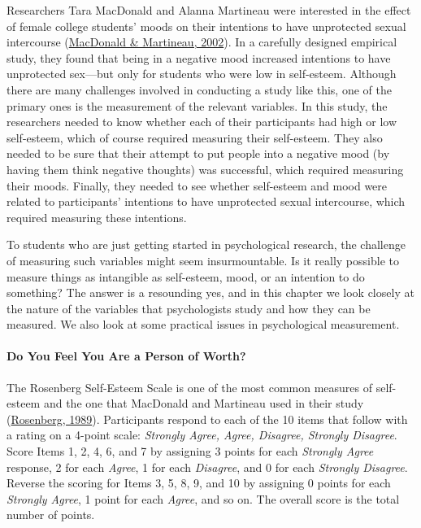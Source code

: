 \documentclass[
]{krantz}
\begin{document}
Researchers Tara MacDonald and Alanna Martineau were interested in the effect of female college students' moods on their intentions to have unprotected sexual intercourse (\protect\hyperlink{ref-macdonald2002self}{MacDonald \& Martineau, 2002}). In a carefully designed empirical study, they found that being in a negative mood increased intentions to have unprotected sex---but only for students who were low in self-esteem. Although there are many challenges involved in conducting a study like this, one of the primary ones is the measurement of the relevant variables. In this study, the researchers needed to know whether each of their participants had high or low self-esteem, which of course required measuring their self-esteem. They also needed to be sure that their attempt to put people into a negative mood (by having them think negative thoughts) was successful, which required measuring their moods. Finally, they needed to see whether self-esteem and mood were related to participants' intentions to have unprotected sexual intercourse, which required measuring these intentions.

To students who are just getting started in psychological research, the challenge of measuring such variables might seem insurmountable. Is it really possible to measure things as intangible as self-esteem, mood, or an intention to do something? The answer is a resounding yes, and in this chapter we look closely at the nature of the variables that psychologists study and how they can be measured. We also look at some practical issues in psychological measurement.

\hypertarget{do-you-feel-you-are-a-person-of-worth}{%
\paragraph*{Do You Feel You Are a Person of Worth?}\label{do-you-feel-you-are-a-person-of-worth}}

The Rosenberg Self-Esteem Scale is one of the most common measures of self-esteem and the one that MacDonald and Martineau used in their study (\protect\hyperlink{ref-rosenberg1989society}{Rosenberg, 1989}). Participants respond to each of the 10 items that follow with a rating on a 4-point scale: \emph{Strongly Agree, Agree, Disagree, Strongly Disagree}. Score Items 1, 2, 4, 6, and 7 by assigning 3 points for each \emph{Strongly Agree} response, 2 for each \emph{Agree}, 1 for each \emph{Disagree}, and 0 for each \emph{Strongly Disagree}. Reverse the scoring for Items 3, 5, 8, 9, and 10 by assigning 0 points for each \emph{Strongly Agree}, 1 point for each \emph{Agree}, and so on. The overall score is the total number of points.
\end{document}

